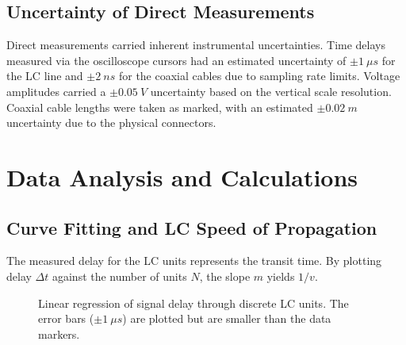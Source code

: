 \documentclass[11pt, letterpaper]{article}
\begin{document}
\subsection{Uncertainty of Direct Measurements}
Direct measurements carried inherent instrumental uncertainties. Time delays measured via the oscilloscope cursors had an estimated uncertainty of $\pm \qty{1}{\mu s}$ for the LC line and $\pm \qty{2}{ns}$ for the coaxial cables due to sampling rate limits. Voltage amplitudes carried a $\pm \qty{0.05}{V}$ uncertainty based on the vertical scale resolution. Coaxial cable lengths were taken as marked, with an estimated $\pm \qty{0.02}{m}$ uncertainty due to the physical connectors.

\section{Data Analysis and Calculations}

\subsection{Curve Fitting and LC Speed of Propagation}
The measured delay for the LC units represents the transit time. By plotting delay $\Delta t$ against the number of units $N$, the slope $m$ yields $1/v$. 

\begin{figure}[H]
\centering
{}
\caption{Linear regression of signal delay through discrete LC units. The error bars ($\pm \qty{1}{\mu s}$) are plotted but are smaller than the data markers.}
\end{figure}
\end{document}
